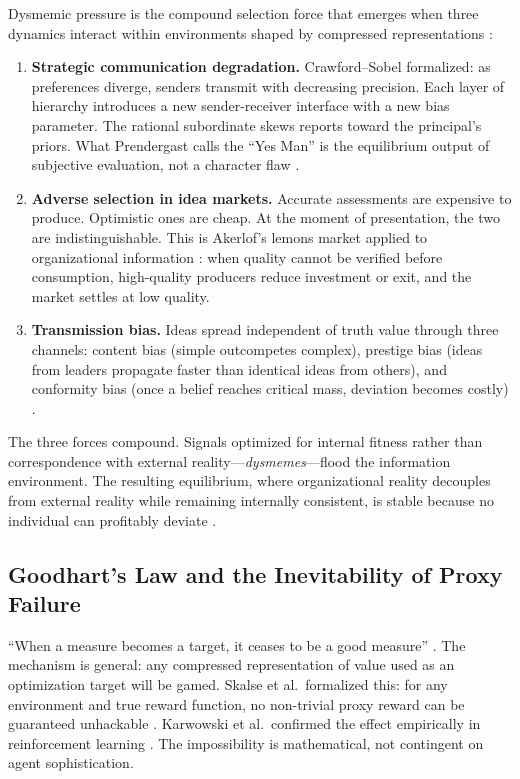 \documentclass[11pt,a4paper]{article}
\begin{document}
Dysmemic pressure is the compound selection force that emerges when three dynamics interact within environments shaped by compressed representations \citep{mcentire2025a}:

\begin{enumerate}
\item \textbf{Strategic communication degradation.} Crawford--Sobel formalized: as preferences diverge, senders transmit with decreasing precision. Each layer of hierarchy introduces a new sender-receiver interface with a new bias parameter. The rational subordinate skews reports toward the principal's priors. What Prendergast calls the ``Yes Man'' is the equilibrium output of subjective evaluation, not a character flaw \citep{prendergast1993}.

\item \textbf{Adverse selection in idea markets.} Accurate assessments are expensive to produce. Optimistic ones are cheap. At the moment of presentation, the two are indistinguishable. This is Akerlof's lemons market applied to organizational information \citep{akerlof1970}: when quality cannot be verified before consumption, high-quality producers reduce investment or exit, and the market settles at low quality.

\item \textbf{Transmission bias.} Ideas spread independent of truth value through three channels: content bias (simple outcompetes complex), prestige bias (ideas from leaders propagate faster than identical ideas from others), and conformity bias (once a belief reaches critical mass, deviation becomes costly) \citep{boyd1985}.
\end{enumerate}

The three forces compound. Signals optimized for internal fitness rather than correspondence with external reality---\emph{dysmemes}---flood the information environment. The resulting equilibrium, where organizational reality decouples from external reality while remaining internally consistent, is stable because no individual can profitably deviate \citep{mcentire2025a}.

\subsection{Goodhart's Law and the Inevitability of Proxy Failure}

``When a measure becomes a target, it ceases to be a good measure'' \citep{goodhart1975}. The mechanism is general: any compressed representation of value used as an optimization target will be gamed. Skalse et al.\ formalized this: for any environment and true reward function, no non-trivial proxy reward can be guaranteed unhackable \citep{skalse2022}. Karwowski et al.\ confirmed the effect empirically in reinforcement learning \citep{karwowski2024}. The impossibility is mathematical, not contingent on agent sophistication.
\end{document}

